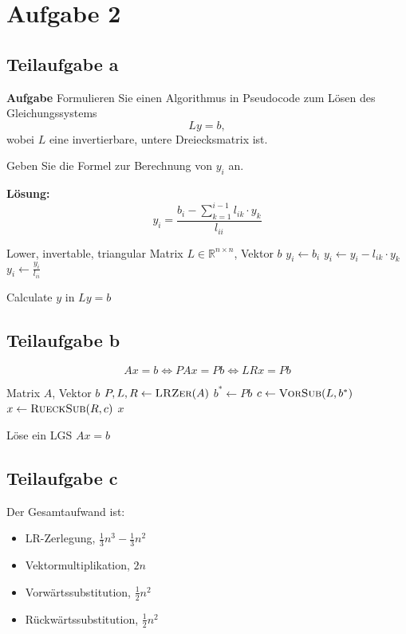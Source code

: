 \section*{Aufgabe 2}
\subsection*{Teilaufgabe a}
\textbf{Aufgabe}
Formulieren Sie einen Algorithmus in Pseudocode zum Lösen des Gleichungssystems
\[Ly = b,\]
wobei $L$ eine invertierbare, untere Dreiecksmatrix ist.

Geben Sie die Formel zur Berechnung von $y_i$ an.

\textbf{Lösung:} 
\[y_i = \frac{b_i - \sum_{k=1}^{i-1} l_{ik} \cdot y_k}{l_{ii}}\]

\begin{algorithm}[H]
    \begin{algorithmic}
    \Require Lower, invertable, triangular Matrix $L \in \mathbb{R}^{n \times n}$, Vektor $b$
			\State $y_i \gets b_i$
				\State $y_i \gets y_i - l_{ik} \cdot y_k$
			\EndFor
			\State $y_i \gets \frac{y_i}{l_{ii}}$
		\EndFor
	\EndProcedure
    \end{algorithmic}
\caption{Calculate $y$ in $Ly = b$}
\end{algorithm}

\subsection*{Teilaufgabe b}
\[Ax = b \Leftrightarrow PAx = Pb \Leftrightarrow LRx = Pb \]

\begin{algorithm}[H]
    \begin{algorithmic}
    \Require Matrix $A$, Vektor $b$
    	\State $P, L, R \gets \Call{LRZer}{A}$
		\State $b^* \gets Pb$
		\State $c \gets \Call{VorSub}{L, b^*}$
		\State $x \gets \Call{RueckSub}{R, c}$
		\State \Return $x$
	\EndProcedure
    \end{algorithmic}
\caption{Löse ein LGS $Ax = b$}
\end{algorithm}

\subsection*{Teilaufgabe c}
Der Gesamtaufwand ist:
\begin{itemize}
	\item LR-Zerlegung, $\frac{1}{3}n^3 - \frac{1}{3} n^2$
	\item Vektormultiplikation, $2n$
	\item Vorwärtssubstitution, $\frac{1}{2} n^2$
	\item Rückwärtssubstitution, $\frac{1}{2} n^2$
\end{itemize}
